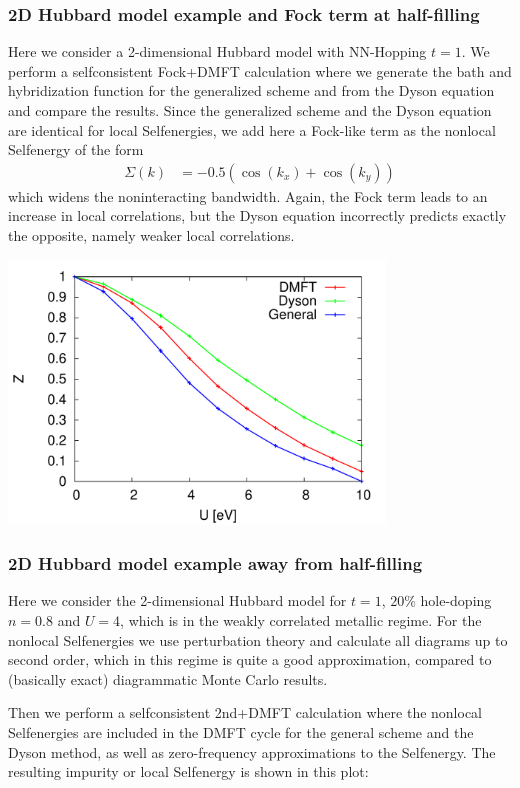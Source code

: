 \documentclass[12pt,a4paper]{scrartcl}
\numberwithin{equation}{section}
\begin{document}
\subsubsection{2D Hubbard model example and Fock term at half-filling}
Here we consider a 2-dimensional Hubbard model with NN-Hopping $t=1$. We perform a selfconsistent
Fock+DMFT calculation where we generate the bath 
and hybridization function for the generalized scheme and from the Dyson equation 
and compare the results. Since the generalized scheme and the Dyson equation
are identical for local Selfenergies, we add here a Fock-like term as the nonlocal
Selfenergy of the form 
\begin{align}
 \Sigma(k) &= -0.5 (\cos(k_x) + \cos(k_y) )
\end{align}
which widens the noninteracting bandwidth. Again,
the Fock term leads to an increase in local correlations,
but the Dyson equation incorrectly predicts exactly the opposite, namely weaker local correlations.

\includegraphics[width=0.75\textwidth]{figs/bathNonlocFromDMFTderiv/Zval_2dHub_fock.pdf}

\subsubsection{2D Hubbard model example away from half-filling}
Here we consider the 2-dimensional Hubbard model for $t=1$, $20\%$ hole-doping $n=0.8$ 
and $U=4$, which is in the weakly correlated metallic regime. 
For the nonlocal Selfenergies we use perturbation theory and calculate all diagrams
up to second order, which in this regime is quite a good approximation,
compared to (basically exact) diagrammatic Monte Carlo results.

Then we perform a selfconsistent 2nd+DMFT calculation where the nonlocal Selfenergies are included in the DMFT cycle
for the general scheme and the Dyson method, as well as zero-frequency approximations to
the Selfenergy. The resulting impurity or local Selfenergy is shown in this plot:
\end{document}
